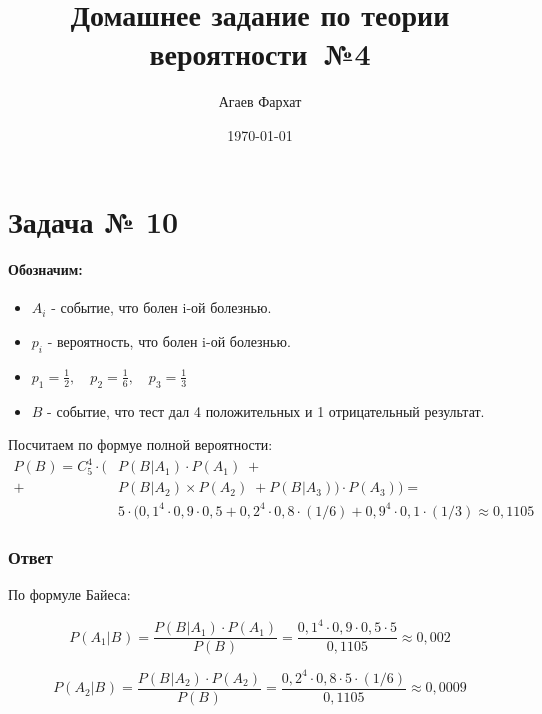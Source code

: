 \documentclass[a4paper, 12pt]{article} %
\author{Агаев Фархат}
\title{Домашнее задание по теории вероятности №4}
\date{\today}
\begin{document}

\maketitle

\section*{Задача № 10}

\paragraph{Обозначим:}
\begin{itemize}
    \item $A_i$ - событие, что болен i-ой болезнью.
    \item $p_i$ - вероятность, что болен i-ой болезнью.
    \item $p_1 = \frac{1}{2}, \quad p_2 = \frac{1}{6}, \quad p_3 = \frac{1}{3}$
    \item $B$ - событие, что тест дал 
    4 положительных и 1 отрицательный результат.
\end{itemize}


Посчитаем по формуе полной вероятности:
\begin{align*}
P(B_{}) = C^4_5 \cdot (&P(B_{}|A_1) \cdot P(A_1)  \; + \\
+ \; &P(B_{}|A_2) \times P(A_2) \;+  P(B_{}|A_3)) \cdot P(A_3)) = \\
&5 \cdot (0,1^4 \cdot 0,9 \cdot 0,5  + 0,2^4 \cdot 0,8 \cdot (1/6) + 0,9^4 \cdot 0,1 \cdot (1/3) \approx 0,1105
 \end{align*}

\subsubsection*{Ответ} 

По формуле Байеса:

\begin{equation*}
    P(A_1|B_{})= \frac{P(B_{}|A_1)\cdot P(A_1)}{P(B_{})} = \frac{0,1^4 \cdot 0,9 \cdot 0,5 \cdot 5}{0,1105} \approx 0,002
\end{equation*}

\begin{equation*}
    P(A_2|B_{})= \frac{P(B_{}|A_2)\cdot P(A_2)}{P(B_{})} = \frac{0,2^4 \cdot 0,8 \cdot 5 \cdot (1/6)}{0,1105} \approx 0,0009
\end{equation*}
\end{document}
